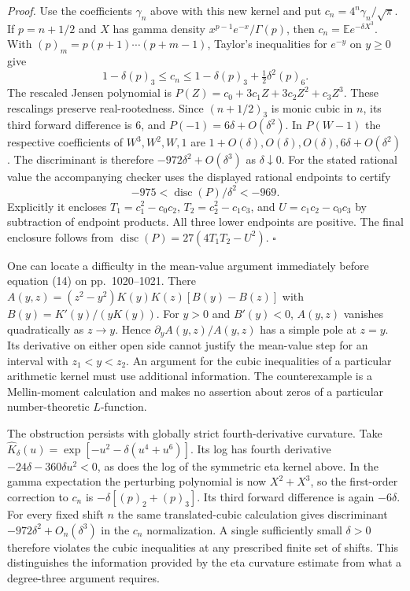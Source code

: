 \textit{Proof.} Use the coefficients $\gamma_n$ above with this new
kernel and put $c_n=4^n\gamma_n/\sqrt\pi$. If $p=n+1/2$ and
$X$ has gamma density $x^{p-1}e^{-x}/\Gamma(p)$, then
$c_n=\mathbb E e^{-\delta X^3}$. With $(p)_m=p(p+1)\cdots(p+m-1)$,
Taylor's inequalities for $e^{-y}$ on $y\ge0$ give
\[
 1-\delta(p)_3\le c_n\le1-\delta(p)_3+
                   \tfrac12\delta^2(p)_6 .
\]
The rescaled Jensen polynomial is
$P(Z)=c_0+3c_1Z+3c_2 Z^2+c_3 Z^3$. These rescalings preserve
real-rootedness. Since $(n+1/2)_3$ is monic cubic in $n$,
its third forward difference is $6$, and $P(-1)=6\delta+O(\delta^2)$.
In $P(W-1)$ the respective coefficients of $W^3,W^2,W,1$ are
$1+O(\delta),O(\delta),O(\delta),6\delta+O(\delta^2)$. The discriminant
is therefore $-972\delta^2+O(\delta^3)$ as $\delta\downarrow0$.
For the stated rational value the accompanying checker uses the displayed
rational endpoints to certify
\[
                 -975<\operatorname{disc}(P)/\delta^2<-969.
\]
Explicitly it encloses $T_1=c_1^2-c_0c_2$, $T_2=c_2^2-c_1c_3$, and
$U=c_1c_2-c_0c_3$ by subtraction of endpoint products. All three lower
endpoints are positive. The final enclosure follows from
$\operatorname{disc}(P)=27(4T_1T_2-U^2)$. \hfill$\square$

One can locate a difficulty in the mean-value argument immediately
before equation (14) on pp.~1020--1021. There
$A(y,z)=(z^2-y^2)K(y)K(z)[B(y)-B(z)]$ with
$B(y)=K'(y)/(yK(y))$. For $y>0$ and $B'(y)<0$, $A(y,z)$ vanishes
quadratically as $z\to y$. Hence $\partial_y A(y,z)/A(y,z)$ has a
simple pole at $z=y$. Its derivative on either open side cannot justify
the mean-value step for an interval with $z_1<y<z_2$.
An argument for the cubic inequalities of a particular arithmetic
kernel must use additional information. The counterexample is a
Mellin-moment calculation and makes no assertion about zeros of a
particular number-theoretic $L$-function.

The obstruction persists with globally strict fourth-derivative curvature.
Take $\widehat K_\delta(u)=\exp[-u^2-\delta(u^4+u^6)]$. Its log has fourth
derivative $-24\delta-360\delta u^2<0$, as does the log of the symmetric
eta kernel above. In the gamma expectation the perturbing polynomial is now
$X^2+X^3$, so the first-order correction to $c_n$ is
$-\delta[(p)_2+(p)_3]$. Its third forward difference is again $-6\delta$.
For every fixed shift $n$ the same translated-cubic calculation gives
discriminant $-972\delta^2+O_n(\delta^3)$ in the $c_n$ normalization.
A single sufficiently small $\delta>0$ therefore violates the cubic
inequalities at any prescribed finite set of shifts. This distinguishes
the information provided by the eta curvature estimate from what a
degree-three argument requires.
